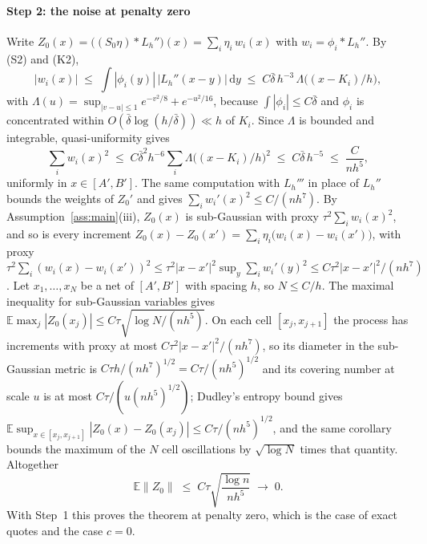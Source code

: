 \documentclass[preprint,12pt,authoryear,times]{elsarticle}
\newcommand{\E}{\mathbb{E}}
\begin{document}
\paragraph{Step 2: the noise at penalty zero}
Write \(Z_0(x)=\bigl((S_0\eta)\ast L_h''\bigr)(x)=\sum_i\eta_i\,w_i(x)\) with \(w_i=\phi_i\ast L_h''\). By (S2) and (K2),
\[
|w_i(x)|\;\le\;\int|\phi_i(y)|\,|L_h''(x-y)|\,\mathrm{d}y
\;\le\;C\bar\delta\,h^{-3}\,\Lambda\bigl((x-K_i)/h\bigr),
\]
with \(\Lambda(u)=\sup_{|v-u|\le 1}e^{-v^2/8}+e^{-u^2/16}\),
because \(\int|\phi_i|\le C\bar\delta\) and \(\phi_i\) is concentrated within \(O(\bar\delta\log(h/\bar\delta))\ll h\) of \(K_i\). Since \(\Lambda\) is bounded and integrable, quasi-uniformity gives
\begin{equation}
\label{eq:pf-var}
\sum_i w_i(x)^2\;\le\;C\bar\delta^2h^{-6}\sum_i\Lambda\bigl((x-K_i)/h\bigr)^2\;\le\;C\bar\delta\,h^{-5}\;\le\;\frac{C}{nh^5},
\end{equation}
uniformly in \(x\in[A',B']\). The same computation with \(L_h'''\) in place of \(L_h''\) bounds the weights of \(Z_0'\) and gives \(\sum_i w_i'(x)^2\le C/(nh^7)\). By Assumption~\ref{ass:main}(iii), \(Z_0(x)\) is sub-Gaussian with proxy \(\tau^2\sum_iw_i(x)^2\), and so is every increment \(Z_0(x)-Z_0(x')=\sum_i\eta_i\bigl(w_i(x)-w_i(x')\bigr)\), with proxy \(\tau^2\sum_i(w_i(x)-w_i(x'))^2\le\tau^2|x-x'|^2\sup_y\sum_iw_i'(y)^2\le C\tau^2|x-x'|^2/(nh^7)\). Let \(x_1,\ldots,x_N\) be a net of \([A',B']\) with spacing \(h\), so \(N\le C/h\). The maximal inequality for sub-Gaussian variables gives \(\E\max_j|Z_0(x_j)|\le C\tau\sqrt{\log N/(nh^5)}\). On each cell \([x_j,x_{j+1}]\) the process has increments with proxy at most \(C\tau^2|x-x'|^2/(nh^7)\), so its diameter in the sub-Gaussian metric is \(C\tau h/(nh^7)^{1/2}=C\tau/(nh^5)^{1/2}\) and its covering number at scale \(u\) is at most \(C\tau/(u(nh^5)^{1/2})\); Dudley's entropy bound \citep[Corollary 2.2.8]{vandervaart1996} gives \(\E\sup_{x\in[x_j,x_{j+1}]}|Z_0(x)-Z_0(x_j)|\le C\tau/(nh^5)^{1/2}\), and the same corollary bounds the maximum of the \(N\) cell oscillations by \(\sqrt{\log N}\) times that quantity. Altogether
\begin{equation}
\label{eq:pf-noise0}
\E\|Z_0\|\;\le\;C\tau\sqrt{\frac{\log n}{nh^5}}\;\to\;0 .
\end{equation}
With Step~1 this proves the theorem at penalty zero, which is the case of exact quotes and the case \(c=0\).
\end{document}

